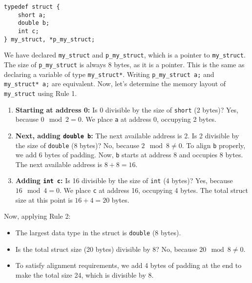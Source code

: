 \noindent\begin{minipage}{0.45\textwidth}
\begin{lstlisting}
typedef struct {
    short a; 
    double b;
    int c;
} my_struct, *p_my_struct;
\end{lstlisting}
\end{minipage}
%
We have declared \texttt{my\_struct} and \texttt{p\_my\_struct}, which is a 
pointer to \texttt{my\_struct}. The size of \texttt{p\_my\_struct} is always 
8 bytes, as it is a pointer. This is the same as declaring a variable of 
type \texttt{my\_struct*}. Writing \texttt{p\_my\_struct a;} and \texttt{my\_struct* a;} 
are equivalent.
%
Now, let's determine the memory layout of \texttt{my\_struct} using Rule 1.
%
\begin{enumerate}
    \item \textbf{Starting at address 0:}  
    Is 0 divisible by the size of \texttt{short} (2 bytes)?  
    Yes, because \( 0 \mod 2 = 0 \).  
    We place \texttt{a} at address 0, occupying 2 bytes.

    \item \textbf{Next, adding \texttt{double b}:}  
    The next available address is 2.  
    Is 2 divisible by the size of \texttt{double} (8 bytes)?  
    No, because \( 2 \mod 8 \neq 0 \).  
    To align \texttt{b} properly, we add 6 bytes of padding.  
    Now, \texttt{b} starts at address 8 and occupies 8 bytes.  
    The next available address is \( 8 + 8 = 16 \).

    \item \textbf{Adding \texttt{int c}:}  
    Is 16 divisible by the size of \texttt{int} (4 bytes)?  
    Yes, because \( 16 \mod 4 = 0 \).  
    We place \texttt{c} at address 16, occupying 4 bytes.  
    The total struct size at this point is \( 16 + 4 = 20 \) bytes.

\end{enumerate}

Now, applying Rule 2:

\begin{itemize}
    \item The largest data type in the struct is \texttt{double} (8 bytes).
    \item Is the total struct size (20 bytes) divisible by 8?  
    No, because \( 20 \mod 8 \neq 0 \).
    \item To satisfy alignment requirements, we add 4 bytes of padding at the 
    end to make the total size 24, which is divisible by 8.
\end{itemize}

